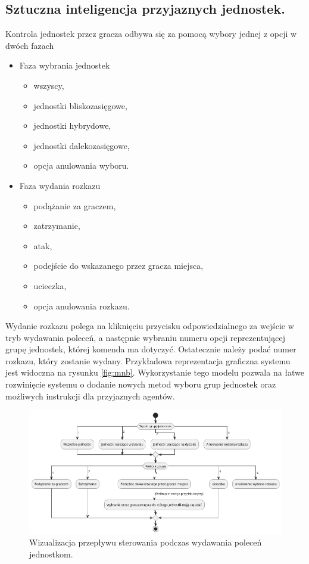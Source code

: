 \subsection{Sztuczna inteligencja przyjaznych jednostek.}

Kontrola jednostek przez gracza odbywa się za pomocą wybory jednej z opcji w dwóch fazach
\begin{itemize}
\item Faza wybrania jednostek
  \begin{itemize}
    \item wszyscy,
    \item jednostki bliskozasięgowe,
    \item jednostki hybrydowe,
    \item jednostki dalekozasięgowe,
    \item opcja anulowania wyboru.
  \end{itemize}

\item Faza wydania rozkazu
  \begin{itemize}
    \item podążanie za graczem,
    \item zatrzymanie,
    \item atak,
    \item podejście do wskazanego przez gracza miejsca,
    \item ucieczka,
    \item opcja anulowania rozkazu.
  \end{itemize}
\end{itemize}

Wydanie rozkazu polega na kliknięciu przycisku odpowiedzialnego za wejście w tryb wydawania poleceń, a następnie
wybraniu numeru opcji reprezentującej grupę jednostek, której komenda ma dotyczyć. Ostatecznie należy podać numer rozkazu, który zostanie wydany.
Przykładowa reprezentacja graficzna systemu jest widoczna na rysunku \ref{fig:mnb}.
Wykorzystanie tego modelu pozwala na łatwe rozwinięcie systemu o dodanie nowych metod wyboru grup jednostek oraz możliwych instrukcji dla przyjaznych agentów.

\begin{figure}[h]
\centering
\includegraphics[width=1\textwidth]{uml/commands}
\caption{Wizualizacja przepływu sterowania podczas wydawania poleceń jednostkom.}
\end{figure}
